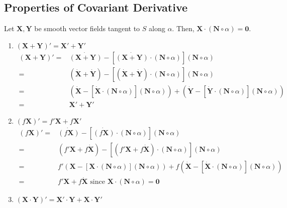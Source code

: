 \subsection{Properties of Covariant Derivative}
Let $\mathbf{X},\mathbf{Y}$ be smooth vector fields tangent to $S$ along $\alpha$. Then, $\mathbf{X} \cdot (\mathbf{N} \circ \alpha) = \mathbf{0}$.
\begin{enumerate}
	\item $(\mathbf{X}+\mathbf{Y})' = \mathbf{X}'+\mathbf{Y}'$\\
	\begin{align*}
		(\mathbf{X} + \mathbf{Y})' = & \dot{(\mathbf{X}+\mathbf{Y})} - [\dot{(\mathbf{X}+\mathbf{Y})} \cdot (\mathbf{N} \circ \alpha)] (\mathbf{N} \circ \alpha) \\
		= & (\dot{\mathbf{X}} + \dot{\mathbf{Y}}) - [(\dot{\mathbf{X}} + \dot{\mathbf{Y}}) \cdot (\mathbf{N} \circ \alpha)] (\mathbf{N} \circ \alpha) \\
		= & \left( \dot{\mathbf{X}} - \left[ \dot{\mathbf{X}} \cdot (\mathbf{N} \circ \alpha) \right] (\mathbf{N} \circ \alpha) \right) + \left( \dot{\mathbf{Y}} - \left[ \dot{\mathbf{Y}} \cdot (\mathbf{N} \circ \alpha) \right] (\mathbf{N} \circ \alpha) \right)\\
		= & \mathbf{X}' + \mathbf{Y}'
	\end{align*}
	\item $(f\mathbf{X})' = f'\mathbf{X} + f\mathbf{X}'$\\
	\begin{align*}
		(f\mathbf{X})' = & \dot{(f\mathbf{X})} - \left[ \dot{(f\mathbf{X})} \cdot (\mathbf{N} \circ \alpha) \right] (\mathbf{N} \circ \alpha) \\
		= & \left( f'\mathbf{X} + f\dot{\mathbf{X}} \right) - \left[ (f'\mathbf{X} + f\dot{\mathbf{X}}) \cdot (\mathbf{N}\circ\alpha) \right] (\mathbf{N} \circ \alpha) \\
		= & f'\left( \mathbf{X}-\left[ \mathbf{X} \cdot (\mathbf{N} \circ \alpha) \right] (\mathbf{N} \circ \alpha) \right) + f\left( \dot{\mathbf{X}} - \left[ \dot{\mathbf{X}} \cdot (\mathbf{N} \circ \alpha) \right] (\mathbf{N} \circ \alpha) \right) \\
		= & f'\mathbf{X} + f \dot{\mathbf{X}} \text{ since } \mathbf{X} \cdot (\mathbf{N} \circ \alpha) = \mathbf{0}
	\end{align*}
	\item $(\mathbf{X} \cdot \mathbf{Y})' = \mathbf{X}' \cdot \mathbf{Y} + \mathbf{X} \cdot \mathbf{Y}'$\\
	\begin{align*}

\end{align*}
\end{enumerate}
